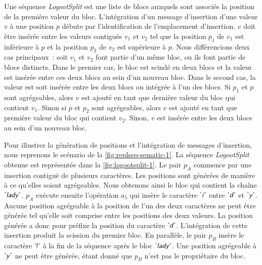 Une séquence \emph{LogootSplit} est une liste de blocs auxquels sont associés la position de la première valeur du bloc.
L'intégration d'un message d'insertion d'une valeur $v$ à une position $p$ débute par l'identification de l'emplacement d'insertion.
$v$ doit être insérée entre les valeurs contiguës $v_1$ et $v_2$ tel que la position $p_1$ de $v_1$ est inférieure à $p$ et la position $p_2$ de $v_2$ est supérieure à $p$.
Nous différencions deux cas principaux~: soit $v_1$ et $v_2$ font partie d'un même bloc, ou ils font partie de blocs distincts.
Dans le premier cas, le bloc est scindé en deux blocs et la valeur est insérée entre ces deux blocs au sein d'un nouveau bloc.
Dans le second cas, la valeur est soit insérée entre les deux blocs ou intégrée à l'un des blocs.
Si $p_1$ et $p$ sont agrégeables, alors $v$ est ajouté en tant que dernière valeur du bloc qui contient $v_1$.
Sinon si $p$ et $p_2$ sont agrégeables, alors $v$ est ajouté en tant que première valeur du bloc qui contient $v_2$.
Sinon, $v$ est insérée entre les deux blocs au sein d'un nouveau bloc.

Pour illustrer la génération de positions et l'intégration de messages d'insertion, nous reprenons le scénario de la \autoref{fig:replseq-sematic-1}.
La séquence \emph{LogootSplit} obtenue est représentée dans la \autoref{fig:logootsplit-1}.
Le pair $p_A$ commence par une insertion contiguë de plusieurs caractères.
Les positions sont générées de manière à ce qu'elles soient agrégeables.
Nous obtenons ainsi le bloc qui contient la chaîne $\textsf{'\textit{lady}'}$.
$p_A$ exécute ensuite l'opération $a_5$ qui insère le caractère $\textsf{'\textit{i}'}$ entre $\textsf{'\textit{d}'}$ et $\textsf{'\textit{y}'}$.
Aucune position agrégeable à la position de l'un des deux caractères ne peut être générée tel qu'elle soit comprise entre les positions des deux valeurs.
La position générée a donc pour préfixe la position du caractère $\textsf{'\textit{d}'}$.
L'intégration de cette insertion produit la scission du premier bloc.
En parallèle, le pair $p_B$ insère le caractère $\textsf{'\textit{\negthinspace!}'}$ à la fin de la séquence après le bloc $\textsf{'\textit{lady}'}$.
Une position agrégeable à $\textsf{'\textit{y}'}$ ne peut être générée, étant donné que $p_B$ n'est pas le propriétaire du bloc.

